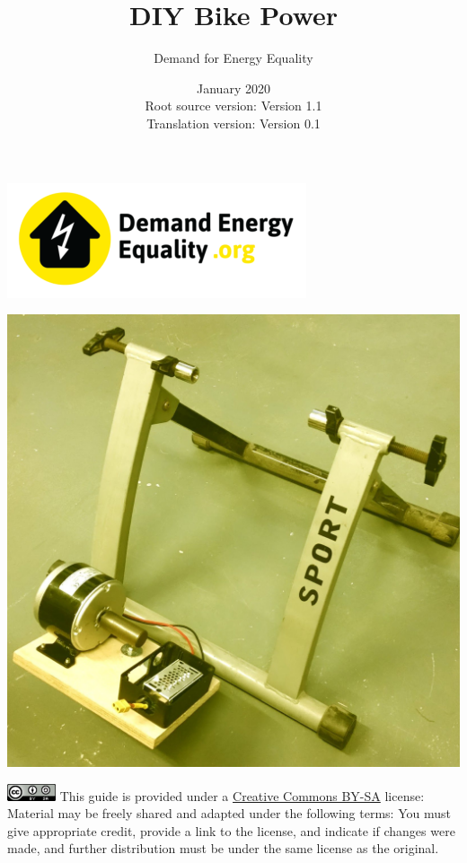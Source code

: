 \documentclass{article}
\title{DIY Bike Power}
\author{Demand for Energy Equality}
\date{January 2020 \\ Root source version: Version 1.1 \\ Translation version: Version 0.1}
\theoremstyle{definition}
\theoremstyle{definition}
\theoremstyle{remark}
\begin{document}
 
\maketitle{}

\begin{center}
  \includegraphics[width=0.25\paperwidth]{../Images/image_0_0_(demand_energy_equality).png}
\end{center}

\begin{center}
  \includegraphics[width=0.45\paperwidth]{../Images/image_0_1_(bike).png}
\end{center}

\vfill
  
\includegraphics[]{../Images/image_0_2_(license).png} \newline
This guide is provided under a \href{https://creativecommons.org/licenses/by-sa/4.0/legalcode}{Creative Commons BY-SA} license: \newline
Material may be freely shared and adapted under the following terms: You must give appropriate credit, provide a link to the license, and indicate if changes were made, and further distribution must be under the same license as the original.
\end{document}
